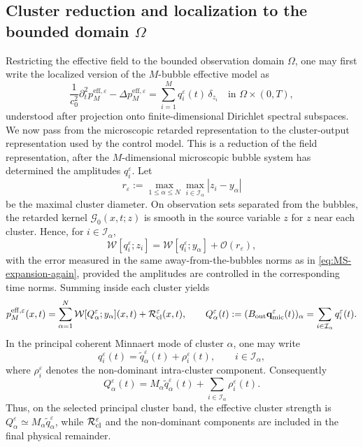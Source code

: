 \documentclass[11pt,a4paper]{article}
\numberwithin{equation}{section}
\newcommand{\veps}{\varepsilon}
\begin{document}
\subsection{Cluster reduction and localization to the bounded domain $\Omega$}
\label{subsec:cluster-reduction-localization}
\noindent
Restricting the effective field to the bounded observation domain $\Omega$, one may first write the localized version of the $M$-bubble effective model as
\begin{equation}
\label{eq:effective-wave-Omega}
 \frac{1}{c_0^2}\partial_t^2 p^{\mathrm{eff},\veps}_{M} - \Delta p^{\mathrm{eff},\veps}_{M}
 = \sum_{i=1}^M q_i^\veps(t)\,\delta_{z_i}
 \quad\text{in }\Omega\times(0,T),
\end{equation}
understood after projection onto finite-dimensional Dirichlet spectral subspaces.
\newline
We now pass from the microscopic retarded representation to the cluster-output representation used by the control model. This is a reduction of the field representation, after the $M$-dimensional microscopic bubble system has determined the amplitudes $q_i^\veps$. Let
\[
 r_\veps:=\max_{1\le\alpha\le N}\max_{i\in\mathcal I_\alpha}|z_i-y_\alpha|
\]
be the maximal cluster diameter. On observation sets separated from the bubbles, the retarded kernel $\mathcal G_0(x,t;z)$ is smooth in the source variable $z$ for $z$ near each cluster. Hence, for $i\in\mathcal I_\alpha$,
\[
 \mathcal W[q_i^\veps;z_i]
 =\mathcal W[q_i^\veps;y_\alpha]+\mathcal O(r_\veps),
\]
with the error measured in the same away-from-the-bubbles norms as in \eqref{eq:MS-expansion-again}, provided the amplitudes are controlled in the corresponding time norms. Summing inside each cluster yields
\begin{equation}
\label{eq:cluster-retarded-field}
 p^{\mathrm{eff},\veps}_{M}(x,t)
 =
 \sum_{\alpha=1}^N \mathcal W[Q_\alpha^\veps;y_\alpha](x,t)
 +\mathcal R_{\rm cl}^\veps(x,t),
 \qquad
 Q_\alpha^\veps(t):=(B_{\rm out}\mathbf q_{\rm mic}^\veps(t))_\alpha
 =\sum_{i\in\mathcal I_\alpha}q_i^\veps(t).
\end{equation}
In the principal coherent Minnaert mode of cluster $\alpha$, one may write
\[
 q_i^\veps(t)=\widetilde q_\alpha^\veps(t)+\rho_i^\veps(t),
 \qquad i\in\mathcal I_\alpha,
\]
where $\rho_i^\veps$ denotes the non-dominant intra-cluster component. Consequently
\[
 Q_\alpha^\veps(t)=M_\alpha\widetilde q_\alpha^\veps(t)
 +\sum_{i\in\mathcal I_\alpha}\rho_i^\veps(t).
\]
Thus, on the selected principal cluster band, the effective cluster strength is $Q_\alpha^\veps\simeq M_\alpha\widetilde q_\alpha^\veps$, while $\mathcal R_{\rm cl}^\veps$ and the non-dominant components are included in the final physical remainder.
\end{document}
